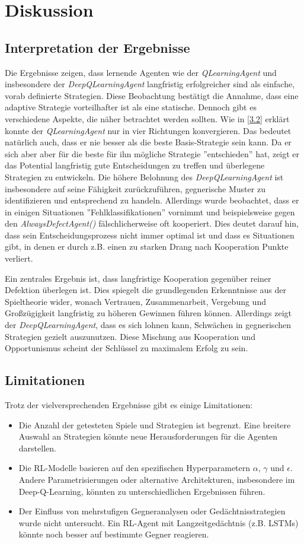 \chapter{Diskussion}
\section{Interpretation der Ergebnisse}
Die Ergebnisse zeigen, dass lernende Agenten wie der \textit{QLearningAgent} und insbesondere der \textit{DeepQLearningAgent} 
langfristig erfolgreicher sind als einfache, vorab definierte Strategien. Diese Beobachtung bestätigt die Annahme, dass 
eine adaptive Strategie vorteilhafter ist als eine statische. Dennoch gibt es verschiedene Aspekte, die näher betrachtet werden sollten.
Wie in \ref{3.2} erklärt konnte der \textit{QLearningAgent} nur in vier Richtungen konvergieren. Das bedeutet natürlich auch, dass er nie 
besser als die beste Basis-Strategie sein kann. Da er sich aber aber für die beste für ihn mögliche Strategie ''entschieden'' hat, zeigt 
er das Potential langfristig gute Entscheidungen zu treffen und überlegene Strategien zu entwickeln.
Die höhere Belohnung des \textit{DeepQLearningAgent} ist insbesondere auf seine Fähigkeit zurückzuführen, gegnerische Muster 
zu identifizieren und entsprechend zu handeln. Allerdings wurde beobachtet, dass er in einigen Situationen ''Fehlklassifikationen''  
vornimmt und beispielsweise gegen den \textit{AlwaysDefectAgent()} fälschlicherweise oft kooperiert. Dies deutet darauf hin,  
dass sein Entscheidungsprozess nicht immer optimal ist und dass es Situationen gibt, in denen er durch z.B. einen zu starken Drang nach Kooperation 
Punkte verliert.

Ein zentrales Ergebnis ist, dass langfristige Kooperation gegenüber reiner Defektion überlegen ist. Dies spiegelt die grundlegenden 
Erkenntnisse aus der Spieltheorie wider, wonach Vertrauen, Zusammenarbeit, Vergebung und Großzügigkeit langfristig zu höheren Gewinnen führen können. 
Allerdings zeigt der \textit{DeepQLearningAgent}, dass es sich lohnen kann, Schwächen in gegnerischen Strategien gezielt auszunutzen. 
Diese Mischung aus Kooperation und Opportunismus scheint der Schlüssel zu maximalem Erfolg zu sein.

\section{Limitationen}
Trotz der vielversprechenden Ergebnisse gibt es einige Limitationen:
\begin{itemize}
    \item Die Anzahl der getesteten Spiele und Strategien ist begrenzt. Eine breitere Auswahl an Strategien könnte neue Herausforderungen für die Agenten darstellen.
    \item Die RL-Modelle basieren auf den spezifischen Hyperparametern $\alpha$, $\gamma$ und $\epsilon$. Andere Parametrisierungen oder alternative Architekturen, insbesondere im Deep-Q-Learning, könnten zu unterschiedlichen Ergebnissen führen.
    \item Der Einfluss von mehrstufigen Gegneranalysen oder Gedächtnisstrategien wurde nicht untersucht. Ein RL-Agent mit Langzeitgedächtnis (z.B. LSTMs) könnte noch besser auf bestimmte Gegner reagieren.
\end{itemize}